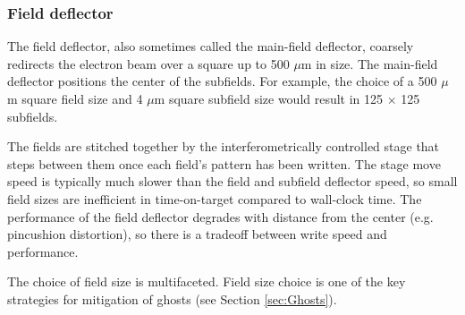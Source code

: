 \documentclass[]{spie}  %
\begin{document}
\subsubsection{Field deflector}
\label{sec:Field}
The field deflector, also sometimes called the main-field deflector, coarsely redirects the electron beam over a square up to 500 $\mu$m in size.  The main-field deflector positions the center of the subfields.  For example, the choice of a 500 $\mu$m square field size and 4 $\mu$m square subfield size would result in 125 $\times$ 125 subfields.

The fields are stitched together by the interferometrically controlled stage that steps between them once each field's pattern has been written.  The stage move speed is typically much slower than the field and subfield deflector speed, so small field sizes are inefficient in time-on-target compared to wall-clock time.  The performance of the field deflector degrades with distance from the center (e.g. pincushion distortion), so there is a tradeoff between write speed and performance.  

The choice of field size is multifaceted.  Field size choice is one of the key strategies for mitigation of ghosts (see Section \ref{sec:Ghosts}).
\end{document}

